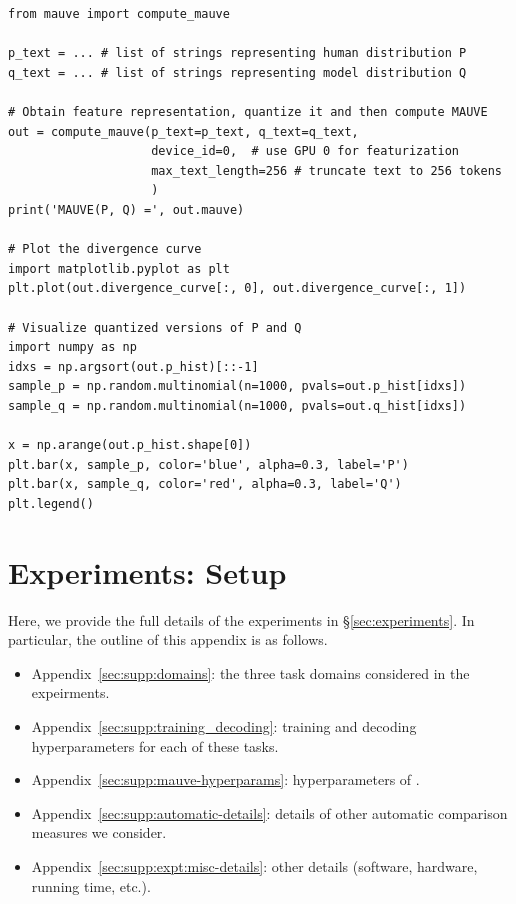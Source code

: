 \documentclass{article}
\theoremstyle{definition}
\newcommand{\name}{{\fontfamily{bch}\selectfont{\textsc{Mauve}}}\xspace}
\begin{document}
\begin{lstlisting}[caption=Compute \name from text]
from mauve import compute_mauve

p_text = ... # list of strings representing human distribution P
q_text = ... # list of strings representing model distribution Q

# Obtain feature representation, quantize it and then compute MAUVE
out = compute_mauve(p_text=p_text, q_text=q_text, 
                    device_id=0,  # use GPU 0 for featurization
                    max_text_length=256 # truncate text to 256 tokens
                    )
print('MAUVE(P, Q) =', out.mauve)

# Plot the divergence curve
import matplotlib.pyplot as plt  
plt.plot(out.divergence_curve[:, 0], out.divergence_curve[:, 1])

# Visualize quantized versions of P and Q
import numpy as np
idxs = np.argsort(out.p_hist)[::-1]
sample_p = np.random.multinomial(n=1000, pvals=out.p_hist[idxs])
sample_q = np.random.multinomial(n=1000, pvals=out.q_hist[idxs])

x = np.arange(out.p_hist.shape[0])
plt.bar(x, sample_p, color='blue', alpha=0.3, label='P')
plt.bar(x, sample_q, color='red', alpha=0.3, label='Q')
plt.legend()

\end{lstlisting} %
\section{Experiments: Setup}
\label{supp:expt_details}

Here, we provide the full details of the experiments in \S\ref{sec:experiments}. In particular, the outline of this appendix is as follows.
\begin{itemize}
    \item Appendix~\ref{sec:supp:domains}: the three task domains considered in the expeirments.
    \item Appendix~\ref{sec:supp:training_decoding}: training and decoding hyperparameters for each of these tasks.
    \item Appendix~\ref{sec:supp:mauve-hyperparams}: hyperparameters of \name.
    \item Appendix~\ref{sec:supp:automatic-details}: details of other automatic comparison measures we consider.
    \item Appendix~\ref{sec:supp:expt:misc-details}: other details (software, hardware, running time, etc.).
\end{itemize}
\end{document}
